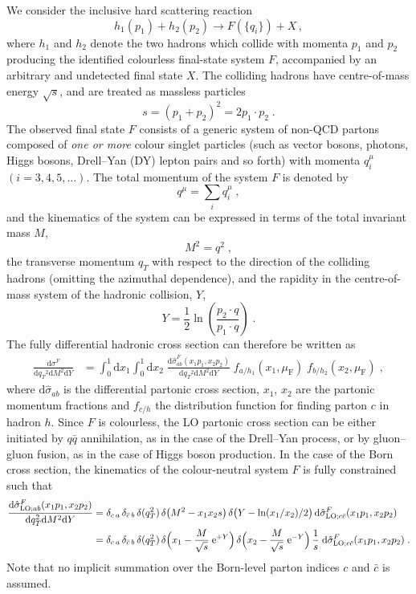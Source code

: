 \documentclass[12pt]{article}
\DeclareRobustCommand{\nn}{\nonumber}
\DeclareRobustCommand{\muf}{\ensuremath{\mu_{\mathrm{F}}}\xspace}
\DeclareRobustCommand{\qt}{\ensuremath{q_T}\xspace}
\DeclareRobustCommand{\rd}{\ensuremath{\mathrm{d}}}
\DeclareRobustCommand{\re}{\ensuremath{\mathrm{e}}}
\DeclareRobustCommand{\LO}{\text{LO}\xspace}
\begin{document}
We consider the inclusive hard scattering reaction 
\begin{equation}
  h_1(p_1)+h_2(p_2)\to F(\{q_i\})+X\, ,
  \label{class}
\end{equation}
where $h_1$ and $h_2$ denote the two hadrons which collide with momenta $p_1$ and $p_2$ producing the identified colourless final-state system $F$, accompanied by an arbitrary and undetected final state $X$. The colliding hadrons have centre-of-mass energy $\sqrt s$, and are treated as massless particles 
$$s= (p_1+p_2)^2 = 2p_1\cdot p_2 \;.$$ 
The observed final state $F$ consists of a generic system of non-QCD partons composed of \emph{one or more} colour singlet particles (such as vector bosons, photons, Higgs bosons, Drell--Yan (DY) lepton pairs and so forth) with momenta $q_i^{\mu}$ $(i=3,4,5,\dots)$. The total momentum of the system $F$ is denoted by 
$$q^{\mu}=\sum_i q_i^\mu \;,$$
and the kinematics of the system can be expressed in terms of the total invariant mass $M$, 
$$M^2=q^2 \;,$$ 
the transverse momentum $\qt$ with respect to the direction of the colliding hadrons (omitting the azimuthal dependence), and the rapidity in the centre-of-mass system of the hadronic collision, $Y$, 
$$Y = \frac{1}{2} \ln \left(\frac{p_2\cdot q}{p_1\cdot q}\right) \;.$$ 
The fully differential hadronic cross section can therefore be written as 
\begin{align}
  \frac{\rd\sigma^{F}}{\rd\qt^2\rd M^2\rd Y}
  &=
  \int_0^1\rd x_1 \int_0^1\rd x_2 \; 
  \frac{\rd\hat{\sigma}^{F}_{ab}(x_1 p_1, x_2 p_2)}{\rd\qt^2\rd M^2\rd Y} \;
  f_{a/h_1}(x_1,\muf) \; f_{b/h_2}(x_2,\muf) \;,
  \label{eq:hadXS_diff}
\end{align}
where $\rd\hat{\sigma}_{ab}$ is the differential partonic cross section, $x_1$, $x_2$ are the partonic momentum fractions and $f_{c/h}$ the distribution function for finding parton $c$ in hadron $h$.
Since $F$ is colourless, the LO partonic cross section can be either initiated by 
$q\bar{q}$ annihilation, as in the case of the Drell--Yan process, or by gluon--gluon fusion, as in the case of Higgs boson production.
In the case of the Born cross section, the kinematics of the colour-neutral system $F$ is fully constrained such that
\begin{align}
  \frac{\rd\hat{\sigma}^{F}_{\LO;ab}(x_1 p_1, x_2 p_2)}{\rd\qt^2\rd M^2\rd Y}
  &=
  \delta_{c\,a} \, \delta_{\bar{c}\,b} \, 
  \delta(\qt^2) \,
  \delta\bigl(M^2-x_1 x_2 s\bigr) \,
  \delta\bigl(Y-\ln(x_1/x_2)/2\bigr) \,
  \rd\hat{\sigma}^{F}_{\LO;c\bar{c}}(x_1 p_1, x_2 p_2)
  \nn\\
  &=
  \delta_{c\,a} \, \delta_{\bar{c}\,b} \, 
  \delta(\qt^2) \,
  \delta\Bigl(x_1-\frac{M}{\sqrt{s}}\;\re^{+Y}\Bigr) \,
  \delta\Bigl(x_2-\frac{M}{\sqrt{s}}\;\re^{-Y}\Bigr) \,
  \frac{1}{s} \;
  \rd\hat{\sigma}^{F}_{\LO;c\bar{c}}(x_1 p_1, x_2 p_2) \;.
  \label{eq:LOpartXS_diff}
\end{align}
Note that no implicit summation over the Born-level parton indices $c$ and $\bar{c}$ is assumed.
\end{document}
